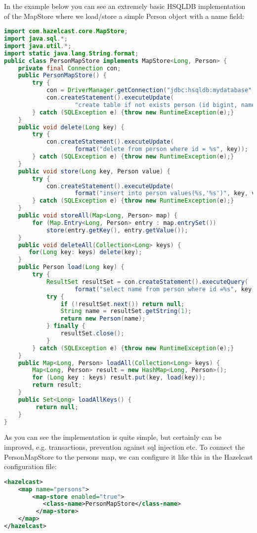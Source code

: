 In the example below you can see an extremely basic HSQLDB implementation of the MapStore where we load/store a simple Person object with a name field:
\begin{lstlisting}[language=java]
import com.hazelcast.core.MapStore;
import java.sql.*;
import java.util.*;
import static java.lang.String.format;
public class PersonMapStore implements MapStore<Long, Person> {
    private final Connection con;
    public PersonMapStore() {
        try {
            con = DriverManager.getConnection("jdbc:hsqldb:mydatabase", "SA", "");
            con.createStatement().executeUpdate(
                    "create table if not exists person (id bigint, name varchar(45))");
        } catch (SQLException e) {throw new RuntimeException(e);}
    }
    public void delete(Long key) {
        try {
            con.createStatement().executeUpdate(
                    format("delete from person where id = %s", key));
        } catch (SQLException e) {throw new RuntimeException(e);}
    }
    public void store(Long key, Person value) {
        try {
            con.createStatement().executeUpdate(
                    format("insert into person values(%s,'%s')", key, value.name));
        } catch (SQLException e) {throw new RuntimeException(e);}
    }
    public void storeAll(Map<Long, Person> map) {
        for (Map.Entry<Long, Person> entry : map.entrySet())
            store(entry.getKey(), entry.getValue());
    }
    public void deleteAll(Collection<Long> keys) {
       for(Long key: keys) delete(key);
    }
    public Person load(Long key) {
        try {
            ResultSet resultSet = con.createStatement().executeQuery(
                    format("select name from person where id =%s", key));
            try {
                if (!resultSet.next()) return null;
                String name = resultSet.getString(1);
                return new Person(name);
            } finally {
                resultSet.close();
            }
        } catch (SQLException e) {throw new RuntimeException(e);}
    }
    public Map<Long, Person> loadAll(Collection<Long> keys) {
        Map<Long, Person> result = new HashMap<Long, Person>();
        for (Long key : keys) result.put(key, load(key));
        return result;
    }
    public Set<Long> loadAllKeys() {
         return null;
    }
}
\end{lstlisting}
As you can see the implementation is quite simple, but certainly can be improved, e.g. transactions, prevention against sql injection etc. To connect the PersonMapStore to the persons map, we can configure it like this in the Hazelcast configuration file:
\begin{lstlisting}[language=xml]
<hazelcast>
    <map name="persons">
        <map-store enabled="true">
           <class-name>PersonMapStore</class-name>
         </map-store>
    </map>
</hazelcast>
\end{lstlisting}

